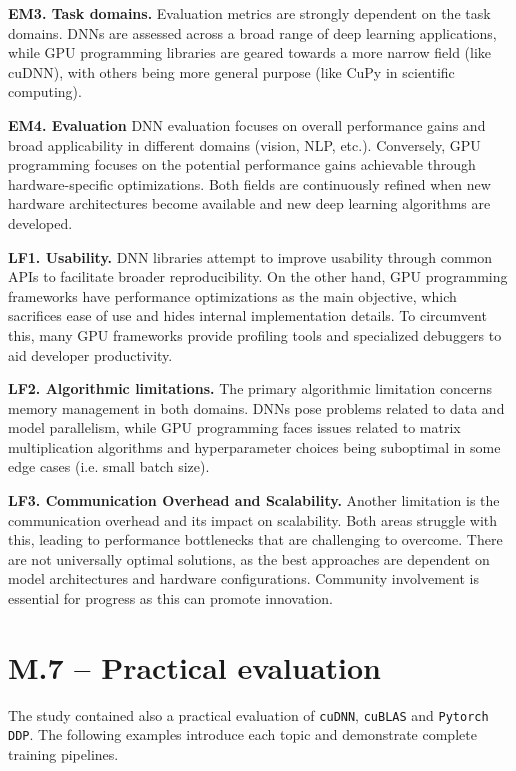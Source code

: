 \textbf{EM3. Task domains.}
Evaluation metrics are strongly dependent on the task domains. DNNs are assessed across
a broad range of deep learning applications, while GPU programming libraries are geared towards
a more narrow field  (like cuDNN), with others being more general purpose (like CuPy in scientific
computing).

\textbf{EM4. Evaluation}
DNN evaluation focuses on overall performance gains and broad applicability in different domains (vision,
NLP, etc.). Conversely, GPU programming focuses on the potential performance gains achievable through
hardware-specific optimizations. Both fields are continuously refined when new hardware architectures
become available and new deep learning algorithms are developed.

\textbf{LF1. Usability.}
DNN libraries attempt to improve usability through common APIs to facilitate broader
reproducibility. On the other hand, GPU programming frameworks have performance optimizations as
the main objective, which sacrifices ease of use and hides internal implementation details.
To circumvent this, many GPU frameworks provide profiling tools and specialized debuggers to aid
developer productivity.

\textbf{LF2. Algorithmic limitations.}
The primary algorithmic limitation concerns memory management in both domains.
DNNs pose problems related to data and model parallelism, while GPU programming faces issues
related to matrix multiplication algorithms and hyperparameter choices being suboptimal in some edge cases
(i.e. small batch size).

\textbf{LF3. Communication Overhead and Scalability.}
Another limitation is the communication overhead and its impact on scalability. Both areas struggle
with this, leading to performance bottlenecks that are challenging to overcome. There are not universally
optimal solutions, as the best approaches are dependent on model architectures and hardware configurations.
Community involvement is essential for progress as this can promote innovation.

\section{M.7 -- Practical evaluation}
\label{sec:practical-evaluation}
The study contained also a practical evaluation of \texttt{cuDNN}, \texttt{cuBLAS} and \texttt{Pytorch DDP}.
The following examples introduce each topic and demonstrate complete training pipelines.

